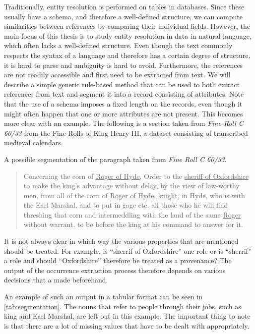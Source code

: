 Traditionally, entity resolution is performed on tables in databases.
Since these usually have a schema, and therefore a well-defined structure, we can compute similarities between references by comparing their individual fields.
However, the main focus of this thesis is to study entity resolution in data in natural language, which often lacks a well-defined structure.
Even though the text commonly respects the syntax of a language and therefore has a certain degree of structure, it is hard to parse and ambiguity is hard to avoid.
Furthermore, the references are not readily accessible and first need to be extracted from text.
We will describe a simple generic rule-based method that can be used to both extract references from text and segment it into a record consisting of attributes.
Note that the use of a schema imposes a fixed length on the records, even though it might often happen that one or more attributes are not present.
This becomes more clear with an example.
The following is a section taken from \emph{Fine Roll C 60/33}\citep{FineRolls} from the Fine Rolls of King Henry III, a dataset consisting of transcribed medieval calendars.

\begin{table}
	\centering
	
	\caption{A possible segmentation of the paragraph taken from \emph{Fine Roll C 60/33}.}
	\label{tab:segmentation}
\end{table}

\begin{quote}
	Concerning the corn of \ul{Roger of Hyde}. Order to the \ul{sheriff of Oxfordshire} to make the king’s advantage without delay, by the view of law-worthy men, from all of the corn of \ul{Roger of Hyde, knight}, in Hyde, who is with the Earl Marshal, and to put in gage etc. all those who he will find threshing that corn and intermeddling with the land of the same \ul{Roger} without warrant, to be before the king at his command to answer for it.
\end{quote}

\noindent It is not always clear in which way the various properties that are mentioned should be treated.
For example, is ``sherrif of Oxfordshire'' one role or is ``sherrif'' a role and should ``Oxfordshire'' therefore be treated as a provenance?
The output of the occurrence extraction process therefore depends on various decisions that a made beforehand.

An example of such an output in a tabular format can be seen in \cref{tab:segmentation}.
The nouns that refer to people through their jobs, such as king and Earl Marshal, are left out in this example.
The important thing to note is that there are a lot of missing values that have to be dealt with appropriately.

